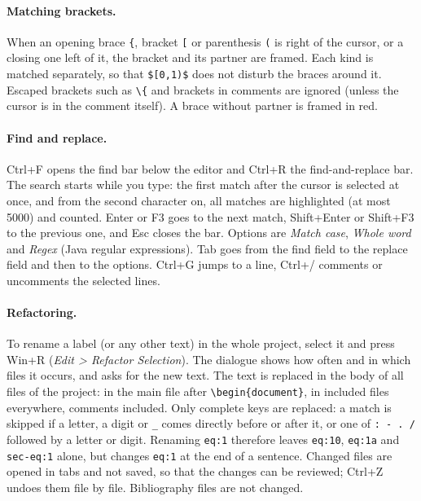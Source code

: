\documentclass[11pt]{article}
\newcommand{\key}[1]{\textsf{#1}}
\newcommand{\menu}[1]{\textsf{\textit{#1}}}
\begin{document}
    \paragraph{Matching brackets.}     When an opening brace \verb+{+, bracket \verb+[+ or parenthesis \verb+(+ is right of the cursor, or a closing one left of it, the bracket and its partner are framed. Each kind is matched separately, so that \verb+$[0,1)$+ does not disturb the braces around it. Escaped brackets such as \verb+\{+ and brackets in comments are ignored (unless the cursor is in the comment itself). A brace without partner is framed in red.

    \paragraph{Find and replace.}     \key{Ctrl+F} opens the find bar below the editor and \key{Ctrl+R} the find-and-replace bar. The search starts while you type: the first match after the cursor is selected at once, and from the second character on, all matches are highlighted (at most 5000) and counted. \key{Enter} or \key{F3} goes to the next match, \key{Shift+Enter} or \key{Shift+F3} to the previous one, and \key{Esc} closes the bar. Options are \emph{Match case}, \emph{Whole word} and \emph{Regex} (Java regular expressions). \key{Tab} goes from the find field to the replace field and then to the options. \key{Ctrl+G} jumps to a line, \key{Ctrl+/} comments or uncomments the selected lines.

    \paragraph{Refactoring.}     To rename a label (or any other text) in the whole project, select it and press \key{Win+R} (\menu{Edit > Refactor Selection}). The dialogue shows how often and in which files it occurs, and asks for the new text. The text is replaced in the body of all files of the project: in the main file after \verb+\begin{document}+, in included files everywhere, comments included. Only complete keys are replaced: a match is skipped if a letter, a digit or \verb+_+ comes directly before or after it, or one of \verb+: - . /+ followed by a letter or digit. Renaming \verb+eq:1+ therefore leaves \verb+eq:10+, \verb+eq:1a+ and \verb+sec-eq:1+ alone, but changes \verb+eq:1+ at the end of a sentence. Changed files are opened in tabs and not saved, so that the changes can be reviewed; \key{Ctrl+Z} undoes them file by file. Bibliography files are not changed.
\end{document}
